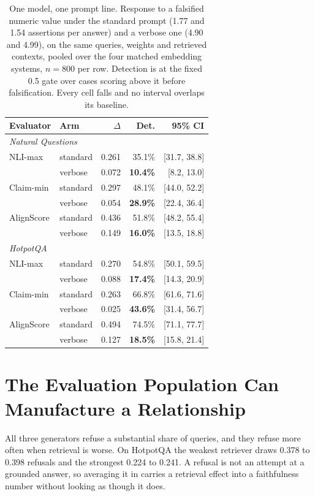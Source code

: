 \documentclass[11pt]{article}
\begin{document}
\begin{table}[t]
\centering\small
\begin{tabular}{llrrr}
\toprule
\textbf{Evaluator} & \textbf{Arm} & $\Delta$ & Det. & 95\% CI \\
\midrule
\multicolumn{5}{l}{\emph{Natural Questions}} \\
NLI-max & standard & 0.261 & 35.1\% & [31.7, 38.8] \\
 & verbose & 0.072 & \textbf{10.4\%} & [8.2, 13.0] \\
Claim-min & standard & 0.297 & 48.1\% & [44.0, 52.2] \\
 & verbose & 0.054 & \textbf{28.9\%} & [22.4, 36.4] \\
AlignScore & standard & 0.436 & 51.8\% & [48.2, 55.4] \\
 & verbose & 0.149 & \textbf{16.0\%} & [13.5, 18.8] \\
\midrule
\multicolumn{5}{l}{\emph{HotpotQA}} \\
NLI-max & standard & 0.270 & 54.8\% & [50.1, 59.5] \\
 & verbose & 0.088 & \textbf{17.4\%} & [14.3, 20.9] \\
Claim-min & standard & 0.263 & 66.8\% & [61.6, 71.6] \\
 & verbose & 0.025 & \textbf{43.6\%} & [31.4, 56.7] \\
AlignScore & standard & 0.494 & 74.5\% & [71.1, 77.7] \\
 & verbose & 0.127 & \textbf{18.5\%} & [15.8, 21.4] \\
\bottomrule
\end{tabular}
\caption{One model, one prompt line. Response to a falsified numeric value under the standard prompt (1.77 and 1.54 assertions per answer) and a verbose one (4.90 and 4.99), on the same queries, weights and retrieved contexts, pooled over the four matched embedding systems, $n = 800$ per row. Detection is at the fixed 0.5 gate over cases scoring above it before falsification. Every cell falls and no interval overlaps its baseline.}
\label{tab:verbosity}
\end{table}


\section{The Evaluation Population Can Manufacture a Relationship}
\label{sec:population}

All three generators refuse a substantial share of queries, and they refuse more often when retrieval is worse. On HotpotQA the weakest retriever draws 0.378 to 0.398 refusals and the strongest 0.224 to 0.241. A refusal is not an attempt at a grounded answer, so averaging it in carries a retrieval effect into a faithfulness number without looking as though it does.
\end{document}
